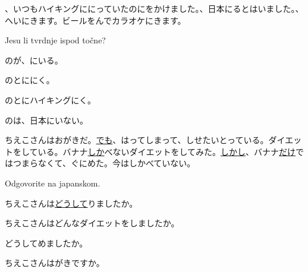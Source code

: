 
\author{Tomislav Mamić}


	
	\begin{bunshou}
		、いつもハイキングににっていたのにをかけました。、日本にるとはいました。、\hspace{10pt}へいにきます。ビールをんでカラオケにきます。
	\end{bunshou}
	
	\begin{mondai}{Jesu li tvrdnje ispod točne?}
		\item {}のが、\furigana{東京}{とうきょう}にいる。
		\item {}のとにに\furigana{行}{い}く。
		\item {}のとにハイキングに\furigana{行}{い}く。
		\item {}のは、日本にいない。
	\end{mondai}

	\begin{bunshou}
		ちえこさんはおがきだ。\underline{でも}、はってしまって、しせたいとっている。ダイエットをしている。バナナ\underline{しか}べないダイエットをしてみた。\underline{しかし}、バナナ\underline{だけ}ではつまらなくて、ぐにめた。今はしかべていない。
	\end{bunshou}

	\begin{mondai}{Odgovorite na japanskom.}
		\item ちえこさんは\underline{どうして}りましたか。
		\item ちえこさんはどんなダイエットをしましたか。
		\item どうしてめましたか。
		\item ちえこさんはがきですか。
	\end{mondai}
